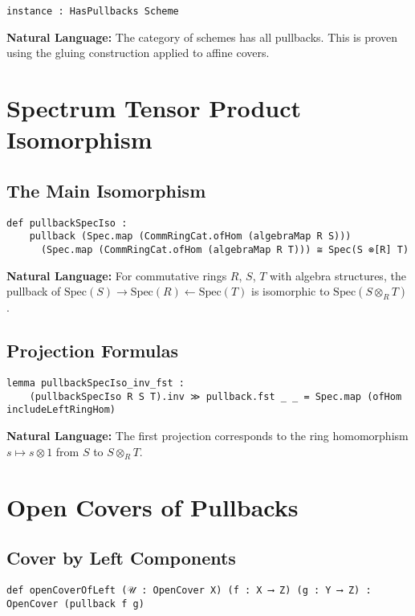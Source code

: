\documentclass{article}
\theoremstyle{definition}
\begin{document}
\begin{lstlisting}
instance : HasPullbacks Scheme
\end{lstlisting}

\textbf{Natural Language:} The category of schemes has all pullbacks. This is proven using the gluing construction applied to affine covers.

\section{Spectrum Tensor Product Isomorphism}

\subsection{The Main Isomorphism}

\begin{lstlisting}
def pullbackSpecIso :
    pullback (Spec.map (CommRingCat.ofHom (algebraMap R S)))
      (Spec.map (CommRingCat.ofHom (algebraMap R T))) ≅ Spec(S ⊗[R] T)
\end{lstlisting}

\textbf{Natural Language:} For commutative rings $R$, $S$, $T$ with algebra structures, the pullback of $\mathrm{Spec}(S) \to \mathrm{Spec}(R) \leftarrow \mathrm{Spec}(T)$ is isomorphic to $\mathrm{Spec}(S \otimes_R T)$.

\subsection{Projection Formulas}

\begin{lstlisting}
lemma pullbackSpecIso_inv_fst :
    (pullbackSpecIso R S T).inv ≫ pullback.fst _ _ = Spec.map (ofHom includeLeftRingHom)
\end{lstlisting}

\textbf{Natural Language:} The first projection corresponds to the ring homomorphism $s \mapsto s \otimes 1$ from $S$ to $S \otimes_R T$.

\section{Open Covers of Pullbacks}

\subsection{Cover by Left Components}

\begin{lstlisting}
def openCoverOfLeft (𝒰 : OpenCover X) (f : X ⟶ Z) (g : Y ⟶ Z) : OpenCover (pullback f g)
\end{lstlisting}
\end{document}
